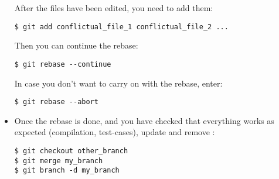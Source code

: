 \begin{itemize}
After the files have been edited, you need to add them:
\begin{lstlisting}
$ git add conflictual_file_1 conflictual_file_2 ...
\end{lstlisting}

Then you can continue the rebase:
\begin{lstlisting}
$ git rebase --continue
\end{lstlisting}

In case you don't want to carry on with the rebase, enter:
\begin{lstlisting}
$ git rebase --abort
\end{lstlisting}

\item Once the rebase is done, and you have checked that everything works as
expected (compilation, test-cases), update  and remove
:
\begin{lstlisting}
$ git checkout other_branch
$ git merge my_branch
$ git branch -d my_branch
\end{lstlisting}

\end{itemize}

